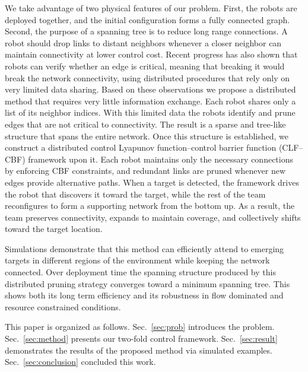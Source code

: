 \documentclass[conference]{IEEEconf}
\theoremstyle{plain}
\begin{document}
We take advantage of two physical features of our problem. First, the robots are deployed together, and the initial configuration forms a fully connected graph. Second, the purpose of a spanning tree is to reduce long range connections. A robot should drop links to distant neighbors whenever a closer neighbor can maintain connectivity at lower control cost. Recent progress \cite{venkateswaran2024} has also shown that robots can verify whether an edge is critical, meaning that breaking it would break the network connectivity, using distributed procedures that rely only on very limited data sharing. Based on these observations we propose a distributed method that requires very little information exchange. Each robot shares only a list of its neighbor indices. With this limited data the robots identify and prune edges that are not critical to connectivity. The result is a sparse and tree-like structure that spans the entire network. Once this structure is established, we construct a distributed control Lyapunov function–control barrier function (CLF–CBF) framework upon it. Each robot maintains only the necessary connections by enforcing CBF constraints, and redundant links are pruned whenever new edges provide alternative paths. When a target is detected, the framework drives the robot that discovers it toward the target, while the rest of the team reconfigures to form a supporting network from the bottom up. As a result, the team preserves connectivity, expands to maintain coverage, and collectively shifts toward the target location.

Simulations demonstrate that this method can efficiently attend to emerging targets in different regions of the environment while keeping the network connected. Over deployment time the spanning structure produced by this distributed pruning strategy converges toward a minimum spanning tree. This shows both its long term efficiency and its robustness in flow dominated and resource constrained conditions.

This paper is organized as follows. Sec.~\ref{sec:prob} introduces the problem. Sec.~\ref{sec:method} presents our two-fold control framework. Sec.~\ref{sec:result} demonstrates the results of the proposed method via simulated examples. Sec.~\ref{sec:conclusion} concluded this work. %
\end{document}
